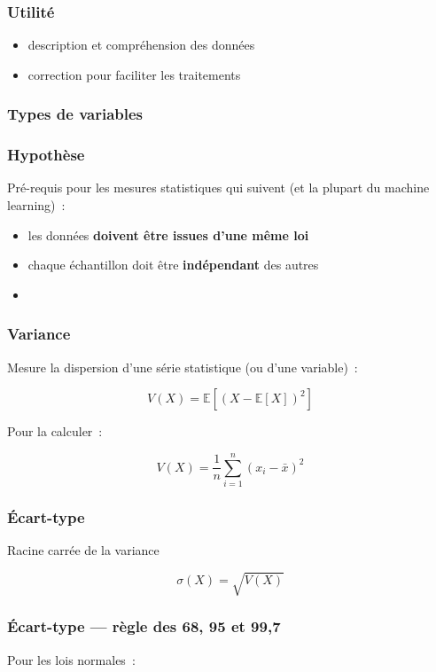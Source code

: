 \documentclass{formation}
\begin{document}
\begin{frame}
  \frametitle{Utilité}
  \begin{itemize}
  \item description et compréhension des données
  \item correction pour faciliter les traitements
  \end{itemize}
\end{frame}

\begin{frame}
  \frametitle{Types de variables}
\end{frame}

\begin{frame}
  \frametitle{Hypothèse}

  Pré-requis pour les mesures statistiques qui suivent (et la plupart
  du machine learning) :
  \begin{itemize}
  \item les données \textbf{doivent être issues d'une même loi}
  \item chaque échantillon doit être \textbf{indépendant} des autres
  \item {} \pause {}
  \end{itemize}
\end{frame}

\begin{frame}[fragile]
  \frametitle{Variance}
  Mesure la dispersion d'une série statistique (ou d'une variable) :

  \[
    V(X) = \mathbb{E}\left[(X - \mathbb{E}[X])^2\right]
  \]

  Pour la calculer :

  \[
    V(X) = \frac{1}{n}\sum_{i = 1}^{n}(x_i - \bar{x})^2
  \]
\end{frame}

\begin{frame}[fragile]
  \frametitle{Écart-type}
  Racine carrée de la variance

  \[
    \sigma(X) = \sqrt{V(X)}
  \]

\end{frame}

\begin{frame}[fragile]
  \frametitle{Écart-type — règle des 68, 95 et 99,7}

  Pour les lois normales :

\end{frame}
\end{document}
